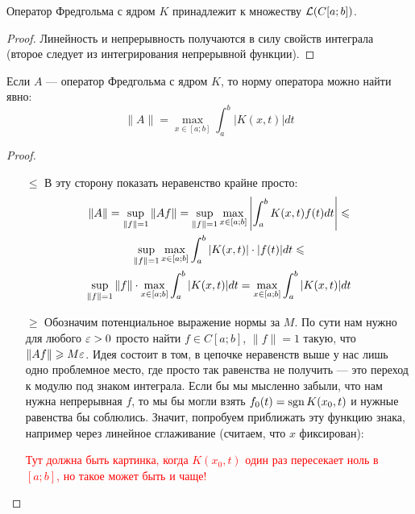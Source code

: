 \begin{proposition}
	Оператор Фредгольма с ядром $K$ принадлежит к множеству $\mathcal{L}(C[a; b])$.
\end{proposition}

\begin{proof}
	Линейность и непрерывность получаются в силу свойств интеграла (второе следует из интегрирования непрерывной функции).
\end{proof}

\begin{proposition}
	Если $A$ --- оператор Фредгольма с ядром $K$, то норму оператора можно найти явно:
	\[
		\|A\| = \max_{x \in [a; b]} \int_a^b |K(x, t)|dt
	\]
\end{proposition}

\begin{proof}~
	\begin{itemize}
		\item[$\le$] В эту сторону показать неравенство крайне просто:
		\begin{multline*}
			\|A\| = \sup_{\|f\| = 1} \|Af\| = \sup_{\|f\| = 1} \max_{x \in [a; b]} \left|\int_a^b K(x, t)f(t)dt\right| \leqslant
			\\
			\sup_{\|f\| = 1} \max_{x \in [a; b]} \int_a^b |K(x, t)| \cdot |f(t)|dt \leqslant
			\\
			\sup_{\|f\| = 1} \|f\| \cdot \max_{x \in [a; b]} \int_a^b |K(x, t)|dt = \max_{x \in [a; b]} \int_a^b |K(x, t)|dt
		\end{multline*}
		
		\item[$\ge$] Обозначим потенциальное выражение нормы за $M$. По сути нам нужно для любого $\varepsilon > 0$ просто найти $f \in C[a; b]$, $\|f\| = 1$ такую, что $\|Af\| \geqslant M\varepsilon$. Идея состоит в том, в цепочке неравенств выше у нас лишь одно проблемное место, где просто так равенства не получить --- это переход к модулю под знаком интеграла. Если бы мы мысленно забыли, что нам нужна непрерывная $f$, то мы бы могли взять $f_0(t) = \operatorname{sgn} K(x_0, t)$ и нужные равенства бы соблюлись. Значит, попробуем приближать эту функцию знака, например через линейное сглаживание (считаем, что $x$ фиксирован):
		
		\textcolor{red}{Тут должна быть картинка, когда $K(x_0, t)$ один раз пересекает ноль в $[a; b]$, но такое может быть и чаще!}
		

\end{itemize}
\end{proof}
